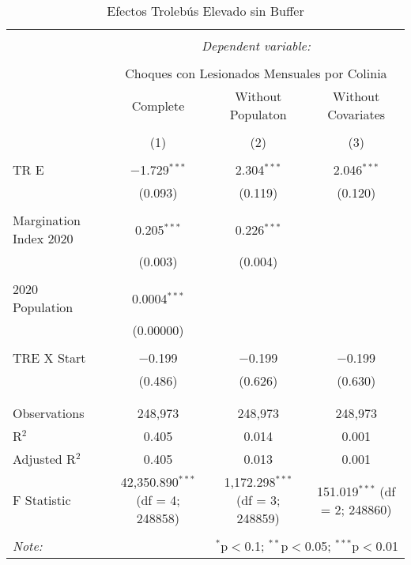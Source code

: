 
\begin{table}[!htbp] \centering 
  \caption{Efectos Trolebús Elevado sin Buffer} 
  \label{} 
\begin{tabular}{@{\extracolsep{5pt}}lccc} 
\\[-1.8ex]\hline 
\hline \\[-1.8ex] 
 & \multicolumn{3}{c}{\textit{Dependent variable:}} \\ 
\cline{2-4} 
\\[-1.8ex] & \multicolumn{3}{c}{Choques con Lesionados Mensuales por Colinia} \\ 
 & Complete & Without Populaton & Without Covariates \\ 
\\[-1.8ex] & (1) & (2) & (3)\\ 
\hline \\[-1.8ex] 
 TR E & $-$1.729$^{***}$ & 2.304$^{***}$ & 2.046$^{***}$ \\ 
  & (0.093) & (0.119) & (0.120) \\ 
  & & & \\ 
 Margination Index 2020 & 0.205$^{***}$ & 0.226$^{***}$ &  \\ 
  & (0.003) & (0.004) &  \\ 
  & & & \\ 
 2020 Population & 0.0004$^{***}$ &  &  \\ 
  & (0.00000) &  &  \\ 
  & & & \\ 
 TRE X Start & $-$0.199 & $-$0.199 & $-$0.199 \\ 
  & (0.486) & (0.626) & (0.630) \\ 
  & & & \\ 
\hline \\[-1.8ex] 
Observations & 248,973 & 248,973 & 248,973 \\ 
R$^{2}$ & 0.405 & 0.014 & 0.001 \\ 
Adjusted R$^{2}$ & 0.405 & 0.013 & 0.001 \\ 
F Statistic & 42,350.890$^{***}$ (df = 4; 248858) & 1,172.298$^{***}$ (df = 3; 248859) & 151.019$^{***}$ (df = 2; 248860) \\ 
\hline 
\hline \\[-1.8ex] 
\textit{Note:}  & \multicolumn{3}{r}{$^{*}$p$<$0.1; $^{**}$p$<$0.05; $^{***}$p$<$0.01} \\ 
\end{tabular} 
\end{table} 
